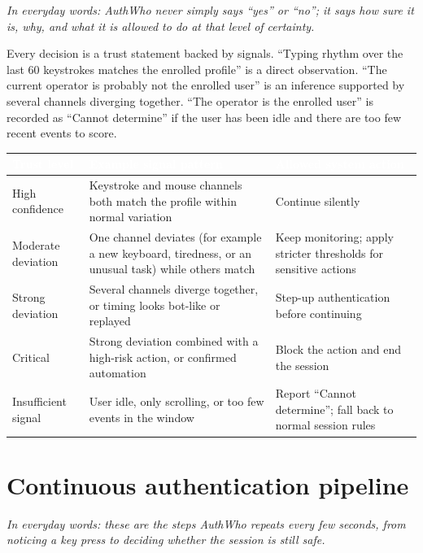 \documentclass[10pt,letterpaper]{article}
\newcommand{\hd}[1]{\textcolor{white}{\bfseries #1}}
\newcommand{\headrow}{\rowcolor{navy}}
\begin{document}
\emph{In everyday words: AuthWho never simply says ``yes'' or ``no''; it says how sure it is, why, and what it is allowed to do at that level of certainty.}

Every decision is a trust statement backed by signals. ``Typing rhythm over the last 60 keystrokes matches the enrolled profile'' is a direct observation. ``The current operator is probably not the enrolled user'' is an inference supported by several channels diverging together. ``The operator is the enrolled user'' is recorded as ``Cannot determine'' if the user has been idle and there are too few recent events to score.

\begin{xltabular}{\textwidth}{P{3.1cm} L P{4.6cm}}
\headrow \hd{Trust level} & \hd{Example signal pattern} & \hd{Allowed system action} \\
\endhead
High confidence & Keystroke and mouse channels both match the profile within normal variation & Continue silently \\ \hline
Moderate deviation & One channel deviates (for example a new keyboard, tiredness, or an unusual task) while others match & Keep monitoring; apply stricter thresholds for sensitive actions \\ \hline
Strong deviation & Several channels diverge together, or timing looks bot-like or replayed & Step-up authentication before continuing \\ \hline
Critical & Strong deviation combined with a high-risk action, or confirmed automation & Block the action and end the session \\ \hline
Insufficient signal & User idle, only scrolling, or too few events in the window & Report ``Cannot determine''; fall back to normal session rules \\
\end{xltabular}

\section{Continuous authentication pipeline}

\emph{In everyday words: these are the steps AuthWho repeats every few seconds, from noticing a key press to deciding whether the session is still safe.}
\end{document}
